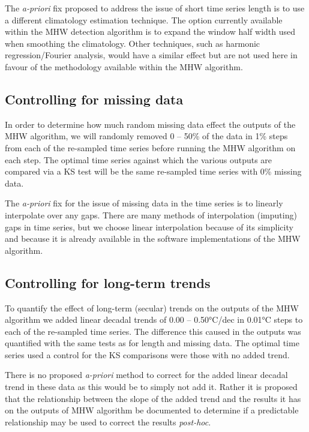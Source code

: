 \documentclass[]{article}
\begin{document}
The \emph{a-priori} fix proposed to address the issue of short time
series length is to use a different climatology estimation technique.
The option currently available within the MHW detection algorithm is to
expand the window half width used when smoothing the climatology. Other
techniques, such as harmonic regression/Fourier analysis, would have a
similar effect but are not used here in favour of the methodology
available within the MHW algorithm.

\subsection{Controlling for missing
data}\label{controlling-for-missing-data}

In order to determine how much random missing data effect the outputs of
the MHW algorithm, we will randomly removed 0 -- 50\% of the data in 1\%
steps from each of the re-sampled time series before running the MHW
algorithm on each step. The optimal time series against which the
various outputs are compared via a KS test will be the same re-sampled
time series with 0\% missing data.

The \emph{a-priori} fix for the issue of missing data in the time series
is to linearly interpolate over any gaps. There are many methods of
interpolation (imputing) gaps in time series, but we choose linear
interpolation because of its simplicity and because it is already
available in the software implementations of the MHW algorithm.

\subsection{Controlling for long-term
trends}\label{controlling-for-long-term-trends}

To quantify the effect of long-term (secular) trends on the outputs of
the MHW algorithm we added linear decadal trends of 0.00 -- 0.50°C/dec
in 0.01°C steps to each of the re-sampled time series. The difference
this caused in the outputs was quantified with the same tests as for
length and missing data. The optimal time series used a control for the
KS comparisons were those with no added trend.

There is no proposed \emph{a-priori} method to correct for the added
linear decadal trend in these data as this would be to simply not add
it. Rather it is proposed that the relationship between the slope of the
added trend and the results it has on the outputs of MHW algorithm be
documented to determine if a predictable relationship may be used to
correct the results \emph{post-hoc}.
\end{document}

